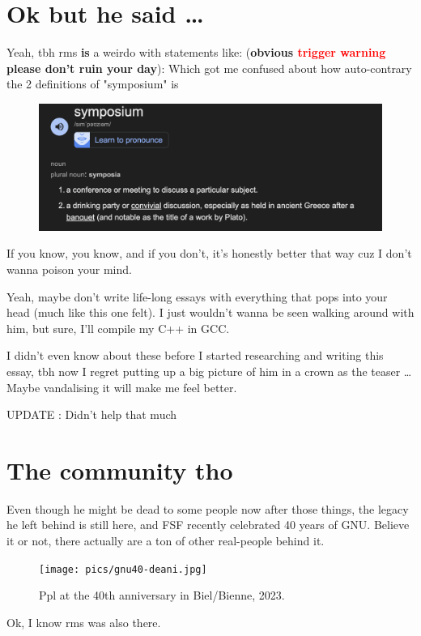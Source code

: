\documentclass[sigplan,screen]{acmart}
\begin{document}
\section{Ok but he said \ldots}
Yeah, tbh rms {\huge \textbf{is}} a weirdo with statements like: (\textbf{obvious \textcolor{red}{trigger warning} please don't ruin your day}): \cite{bro-wtf-1} \cite{bro-wtf-2} \cite{bro-wtf-3} \cite{bro-wtf-4} \cite{bro-wtf-5} \cite{bro-wtf-toate}
Which got me confused about how auto-contrary the 2 definitions of "symposium" is
\begin{figure}[H]
	\centering
	\includegraphics[width=\columnwidth]{pics/symposium.png}	
	\label{fig:symposium-def}
\end{figure}
If you know, you know, and if you don't, it's honestly better that way cuz I don't wanna poison your mind.

Yeah, maybe don't write life-long essays with everything that pops into your head (much like this one felt). I just wouldn't wanna be seen walking around with him, but sure, I'll compile my C++ in GCC.

I didn't even know about these before I started researching and writing this essay, tbh now I regret putting up a big picture of him in a crown as the teaser \ldots Maybe vandalising it will make me feel better.

UPDATE : Didn't help that much

\section{The community tho}
Even though he might be dead to some people now after those things, the legacy he left behind is still here, and FSF recently celebrated 40 years of GNU. Believe it or not, there actually are a ton of other real-people behind it. \cite{gnu-forty-years}
\begin{figure}[H]
	\texttt{[image: pics/gnu40-deani.jpg]}	
	\caption{Ppl at the 40th anniversary in Biel/Bienne, 2023.}
	\label{fig:gnu-anniversary}	
\end{figure}
Ok, I know rms was also there. \cite{gnu-forty-years-stallman}
\end{document}
